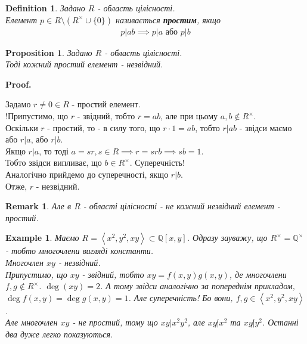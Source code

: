 \documentclass[a4paper, 10pt]{article}
\makeatletter
\theoremstyle{theoremdd}
\theoremstyle{theoremdd}
\newtheorem{definition}[theorem]{Definition}
\theoremstyle{theoremdd}
\theoremstyle{theoremdd}
\newtheorem{example}[theorem]{Example}
\theoremstyle{theoremdd}
\newtheorem{proposition}[theorem]{Proposition}
\theoremstyle{theoremdd}
\newtheorem{remark}[theorem]{Remark}
\theoremstyle{theoremdd}
\theoremstyle{theoremdd}
\renewenvironment{proof}[1][Proof.\\]{\par
\pushQED{\hfill \qed}%
\normalfont \topsep6\p@\@plus6\p@\relax
\trivlist
\item\relax
{\bfseries
#1\@addpunct{.}}\hspace\labelsep\ignorespaces
}{%
\popQED\endtrivlist\@endpefalse
}
\makeatother
\begin{document}
\begin{definition}
Задано $R$ - область цілісності.\\
Елемент $p \in R \setminus (R^\times \cup \{0\})$ називається \textbf{простим}, якщо
\begin{align*}
p | ab \implies p | a \text{ або } p | b
\end{align*}
\end{definition}

\begin{proposition}
Задано $R$ - область цілісності.\\
Тоді кожний простий елемент - незвідний.
\end{proposition}

\begin{proof}
Задамо $r \neq 0 \in R$ - простий елемент.\\
!Припустимо, що $r$ -  звідний, тобто $r = ab$, але при цьому $a,b \not\in R^\times$.\\
Оскільки $r$ - простий, то - в силу того, що $r \cdot 1 = ab$, тобто $r | ab$ - звідси маємо або $r|a$, або $r|b$.\\
Якщо $r|a$, то тоді $a = sr, s \in R \implies r = srb \implies sb=1$.\\
Тобто звідси випливає, що $b \in R^\times$. Суперечність!\\
Аналогічно прийдемо до суперечності, якщо $r|b$.\\
Отже, $r$ - незвідний.
\end{proof}

\begin{remark}
Але в $R$ - області цілісності - не кожний незвідний елемент - простий.
\end{remark}

\begin{example}
Маємо $R = \left<x^2,y^2,xy \right> \subset \mathbb{Q}[x,y]$. Одразу зауважу, що $R^\times = \mathbb{Q}^\times$ - тобто многочлени вигляді константи.\\
Многочлен $xy$ - незвідний.\\
Припустимо, що $xy$ - звідний, тобто $xy = f(x,y)g(x,y)$, де многочлени $f,g \not\in R^\times$. $\deg (xy) = 2$. А тому звідси аналогічно за попереднім прикладом, $\deg f(x,y) = \deg g(x,y) = 1$. Але суперечність! Бо вони, $f,g \in \left< x^2,y^2, xy\right>$.\\
Але многочлен $xy$ - не простий, тому що $xy | x^2y^2$, але $xy \not| x^2$ та $xy \not| y^2$. Останні два дуже легко показуються.
\end{example}
\end{document}
